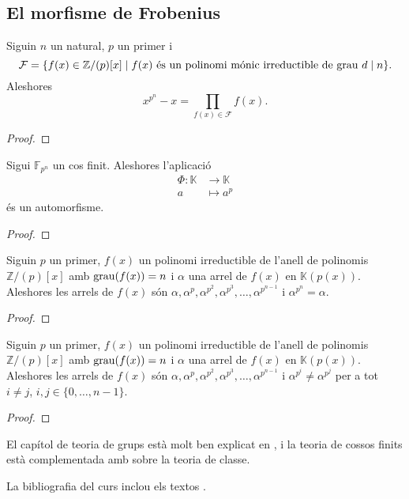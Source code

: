 \documentclass[../Apunts.tex]{subfiles}
\begin{document}
	\subsection{El morfisme de Frobenius}	%
	\begin{theorem}
		Siguin \(n\) un natural, \(p\) un primer i
		\[\mathcal{F}=\{f(x)\in\mathbb{Z}/(p)[x]\mid f(x)\text{ és un polinomi mónic irreductible de grau }d\mathrel{|} n\}.\]
		Aleshores
		\[x^{p^{n}}-x=\prod_{f(x)\in\mathcal{F}}f(x).\]
		\begin{proof}
		\end{proof}
	\end{theorem}
	\begin{proposition}
		Sigui \(\mathbb{F}_{p^{n}}\) un cos finit. Aleshores l'aplicació
		\begin{align*}
		\Phi\colon\mathbb{K}&\longrightarrow\mathbb{K}\\
		a&\longmapsto a^{p}
		\end{align*}
		és un automorfisme.
		\begin{proof}
		\end{proof}
	\end{proposition}
	\begin{theorem}
		Siguin \(p\) un primer, \(f(x)\) un polinomi irreductible de l'anell de polinomis \(\mathbb{Z}/(p)[x]\) amb \(\operatorname{grau}(f(x))=n\) i \(\alpha\) una arrel de \(f(x)\) en \(\mathbb{K}(p(x))\). Aleshores les arrels de \(f(x)\) són \(\alpha,\alpha^{p},\alpha^{p^{2}},\alpha^{p^{3}},\dots,\alpha^{p^{n-1}}\) i \(\alpha^{p^{n}}=\alpha\).
		\begin{proof}
		\end{proof}
	\end{theorem}
	\begin{theorem}
		Siguin \(p\) un primer, \(f(x)\) un polinomi irreductible de l'anell de polinomis \(\mathbb{Z}/(p)[x]\) amb \(\operatorname{grau}(f(x))=n\) i \(\alpha\) una arrel de \(f(x)\) en \(\mathbb{K}(p(x))\). Aleshores les arrels de \(f(x)\) són \(\alpha,\alpha^{p},\alpha^{p^{2}},\alpha^{p^{3}},\dots,\alpha^{p^{n-1}}\) i \(\alpha^{p^{i}}\neq\alpha^{p^{j}}\) per a tot \(i\neq j\), \(i,j\in\{0,\dots,n-1\}\).
		\begin{proof}
		\end{proof}
	\end{theorem}
	\printbibliography
	El capítol de teoria de grups està molt ben explicat en \cite{NumerosGruposyAnillos}, i la teoria de cossos finits està complementada amb \cite{AntoineRosaCampsMoncasiIntroduccioAlgebraAbstracta} sobre la teoria de classe.
	
	La bibliografia del curs inclou els textos \cite{NumerosGruposyAnillos, AntoineRosaCampsMoncasiIntroduccioAlgebraAbstracta, CedoAlgebraBasica, CohnBasicAlgebra, FelixConcepcionSebastianIntroduccionAlAlgebra, FraleighFirstCourseAbstractAlgebra, HungerfordAlgebra}.
\end{document}
